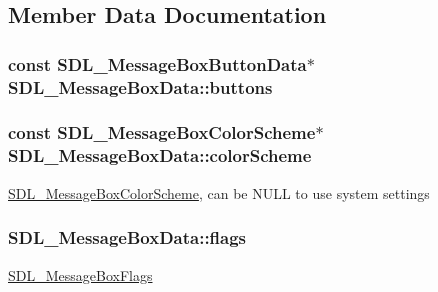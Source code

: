 \subsection{Member Data Documentation}
\subsubsection[{\texorpdfstring{buttons}{buttons}}]{\setlength{\rightskip}{0pt plus 5cm}const {\bf S\+D\+L\+\_\+\+Message\+Box\+Button\+Data}$\ast$ S\+D\+L\+\_\+\+Message\+Box\+Data\+::buttons}\hypertarget{struct_s_d_l___message_box_data_a265e47aab749e384661ae91d3e11e0db}{}\label{struct_s_d_l___message_box_data_a265e47aab749e384661ae91d3e11e0db}
\subsubsection[{\texorpdfstring{color\+Scheme}{colorScheme}}]{\setlength{\rightskip}{0pt plus 5cm}const {\bf S\+D\+L\+\_\+\+Message\+Box\+Color\+Scheme}$\ast$ S\+D\+L\+\_\+\+Message\+Box\+Data\+::color\+Scheme}\hypertarget{struct_s_d_l___message_box_data_a18744865a3e89e260db5f01aee579e35}{}\label{struct_s_d_l___message_box_data_a18744865a3e89e260db5f01aee579e35}
\hyperlink{struct_s_d_l___message_box_color_scheme}{S\+D\+L\+\_\+\+Message\+Box\+Color\+Scheme}, can be N\+U\+LL to use system settings 
\subsubsection[{\texorpdfstring{flags}{flags}}]{ S\+D\+L\+\_\+\+Message\+Box\+Data\+::flags}\hypertarget{struct_s_d_l___message_box_data_a113d016f760bf4e4156b0f376358d6a0}{}\label{struct_s_d_l___message_box_data_a113d016f760bf4e4156b0f376358d6a0}
\hyperlink{_s_d_l__messagebox_8h_a97f06819ac610581044fdb93d81eed37}{S\+D\+L\+\_\+\+Message\+Box\+Flags} 
